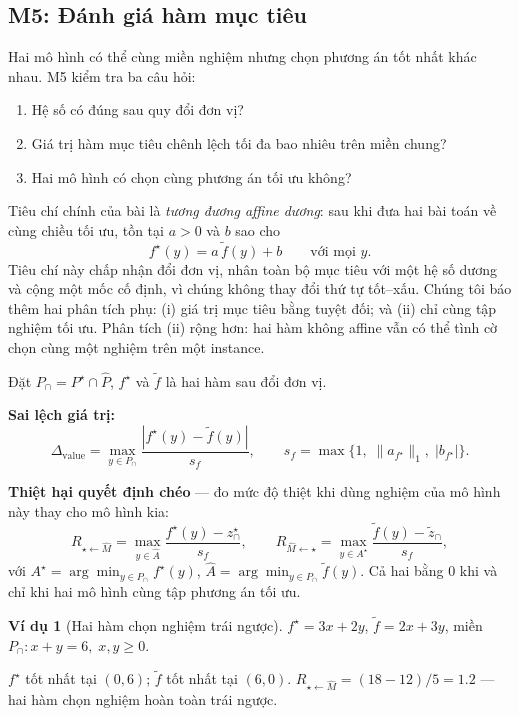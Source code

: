 \documentclass[11pt,a4paper]{article}
\theoremstyle{plain}
\theoremstyle{definition}
\newtheorem{example}[theorem]{Ví dụ}
\theoremstyle{remark}
\newcommand{\LLM}{\widehat{M}}
\newcommand{\Pgt}{P^{\star}}
\newcommand{\Pllm}{\widehat{P}}
\begin{document}
\subsection{M5: Đánh giá hàm mục tiêu}

Hai mô hình có thể cùng miền nghiệm nhưng chọn phương án tốt nhất khác nhau.
M5 kiểm tra ba câu hỏi:
\begin{enumerate}
  \item Hệ số có đúng sau quy đổi đơn vị?
  \item Giá trị hàm mục tiêu chênh lệch tối đa bao nhiêu trên miền chung?
  \item Hai mô hình có chọn cùng phương án tối ưu không?
\end{enumerate}

Tiêu chí chính của bài là \emph{tương đương affine dương}: sau khi đưa hai bài
toán về cùng chiều tối ưu, tồn tại $a>0$ và $b$ sao cho
\begin{equation}
  f^\star(y) = a\,\tilde{f}(y) + b \qquad \text{với mọi } y.
\end{equation}
Tiêu chí này chấp nhận đổi đơn vị, nhân toàn bộ mục tiêu với một hệ số dương và
cộng một mốc cố định, vì chúng không thay đổi thứ tự tốt--xấu. Chúng tôi báo thêm
hai phân tích phụ: (i) giá trị mục tiêu bằng tuyệt đối; và (ii) chỉ cùng tập
nghiệm tối ưu. Phân tích (ii) rộng hơn: hai hàm không affine vẫn có thể tình cờ
chọn cùng một nghiệm trên một instance.

Đặt $P_\cap = \Pgt \cap \Pllm$, $f^\star$ và $\tilde{f}$ là hai hàm sau đổi đơn vị.

\textbf{Sai lệch giá trị:}
\begin{equation}
  \Delta_{\mathrm{value}} = \max_{y \in P_\cap} \frac{|f^\star(y) - \tilde{f}(y)|}{s_f},
  \qquad s_f = \max\{1,\; \|a_{f^\star}\|_1,\; |b_{f^\star}|\}.
\end{equation}

\textbf{Thiệt hại quyết định chéo} --- đo mức độ thiệt khi dùng nghiệm của mô hình
này thay cho mô hình kia:
\begin{equation}
  R_{\star \leftarrow \LLM} = \max_{y \in \widehat{A}}
  \frac{f^\star(y) - z^\star_\cap}{s_f}, \qquad
  R_{\LLM \leftarrow \star} = \max_{y \in A^\star}
  \frac{\tilde{f}(y) - \tilde{z}_\cap}{s_f},
\end{equation}
với $A^\star = \arg\min_{y \in P_\cap} f^\star(y)$,
$\widehat{A} = \arg\min_{y \in P_\cap} \tilde{f}(y)$.
Cả hai bằng 0 khi và chỉ khi hai mô hình cùng tập phương án tối ưu.

\begin{example}[Hai hàm chọn nghiệm trái ngược]
$f^\star = 3x + 2y$, $\tilde{f} = 2x + 3y$, miền $P_\cap: x + y = 6,\; x, y \geq 0$.

$f^\star$ tốt nhất tại $(0, 6)$; $\tilde{f}$ tốt nhất tại $(6, 0)$.
$R_{\star \leftarrow \LLM} = (18 - 12)/5 = 1.2$ --- hai hàm chọn nghiệm hoàn toàn trái ngược.
\end{example}
\end{document}
